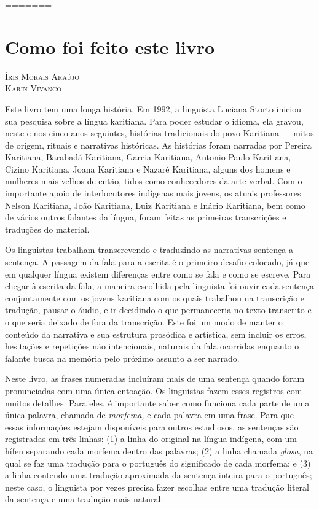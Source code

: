 =======
\chapter{Como foi feito este livro}

\begin{flushright}
\textsc{Íris Morais Araújo}\\
\textsc{Karin Vivanco}
\end{flushright}

\noindent{}Este livro tem uma longa história. Em 1992, a linguista Luciana Storto
iniciou sua pesquisa sobre a língua karitiana. Para poder estudar o
idioma, ela gravou, neste e nos cinco anos seguintes, histórias
tradicionais do povo Karitiana --- mitos de origem, rituais e narrativas
históricas. As histórias foram narradas por Pereira Karitiana, Barabadá
Karitiana, Garcia Karitiana, Antonio Paulo Karitiana, Cizino Karitiana,
Joana Karitiana e Nazaré Karitiana, alguns dos homens e mulheres mais
velhos de então, tidos como conhecedores da arte verbal. Com o
importante apoio de interlocutores indígenas mais jovens, os atuais
professores Nelson Karitiana, João Karitiana, Luiz Karitiana e Inácio
Karitiana, bem como de vários outros falantes da língua, foram feitas as
primeiras transcrições e traduções do material.

Os linguistas trabalham transcrevendo e traduzindo as narrativas
sentença a sentença. A passagem da fala para a escrita é o primeiro
desafio colocado, já que em qualquer língua existem diferenças entre
como se fala e como se escreve. Para chegar à escrita da fala, a maneira
escolhida pela linguista foi ouvir cada sentença conjuntamente com os
jovens karitiana com os quais trabalhou na transcrição e tradução,
pausar o áudio, e ir decidindo o que permaneceria no texto transcrito e
o que seria deixado de fora da transcrição. Este foi um modo de manter o
conteúdo da narrativa e sua estrutura prosódica e artística, sem incluir
os erros, hesitações e repetições não intencionais, naturais da fala
ocorridas enquanto o falante busca na memória pelo próximo assunto a ser
narrado.

Neste livro, as frases numeradas incluíram mais de uma sentença quando
foram pronunciadas com uma única entoação. Os linguistas fazem esses
registros com muitos detalhes. Para eles, é importante saber como
funciona cada parte de uma única palavra, chamada de \emph{morfema,} e
cada palavra em uma frase. Para que essas informações estejam
disponíveis para outros estudiosos, as sentenças são registradas em três
linhas: (1) a linha do original na língua indígena, com um hífen
separando cada morfema dentro das palavras; (2) a linha chamada
\emph{glosa}, na qual se faz uma tradução para o português do
significado de cada morfema; e (3) a linha contendo uma tradução
aproximada da sentença inteira para o português; neste caso, o linguista
por vezes precisa fazer escolhas entre uma tradução literal da sentença
e uma tradução mais natural:

